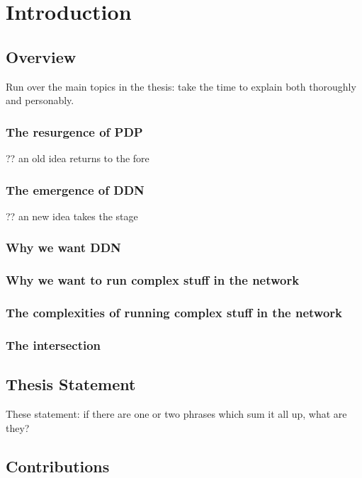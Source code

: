 \chapter{Introduction}


\section{Overview}

Run over the main topics in the thesis: take the time to explain both thoroughly and personably.

\subsection{The resurgence of PDP}
?? an old idea returns to the fore

\subsection{The emergence of DDN}
?? an new idea takes the stage

\subsection{Why we want DDN}

\subsection{Why we want to run complex stuff in the network}

\subsection{The complexities of running complex stuff in the network}

\subsection{The intersection}

\section{Thesis Statement}

These statement: if there are one or two phrases which sum it all up, what are they?

\section{Contributions}

